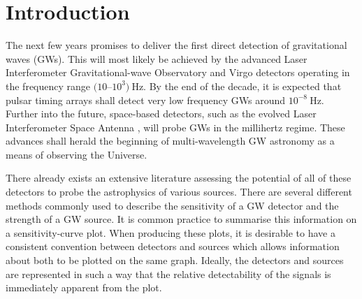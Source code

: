 \section{Introduction}


The next few years promises to deliver the first direct detection of gravitational waves (GWs). This will most likely be achieved by the advanced Laser Interferometer Gravitational-wave Observatory \citep[LIGO;][]{2010CQGra..27h4006H} and Virgo \citep{Accadia2011} detectors operating in the frequency range $(10$--$10^{3})~\mathrm{Hz}$. By the end of the decade, it is expected that pulsar timing arrays \citep[PTAs;][]{1990ApJ361300F} shall detect very low frequency GWs around $10^{-8}~\mathrm{Hz}$. Further into the future, space-based detectors, such as the evolved Laser Interferometer Space Antenna \citep[eLISA;][]{2012CQGra..29l4016A}, will probe GWs in the millihertz regime. These advances shall herald the beginning of multi-wavelength GW astronomy as a means of observing the Universe.

There already exists an extensive literature assessing the potential of all of these detectors to probe the astrophysics of various sources. There are several different methods commonly used to describe the sensitivity of a GW detector and the strength of a GW source. It is common practice to summarise this information on a sensitivity-curve plot. When producing these plots, it is desirable to have a consistent convention between detectors and sources which allows information about both to be plotted on the same graph. Ideally, the detectors and sources are represented in such a way that the relative detectability of the signals is immediately apparent from the plot.

